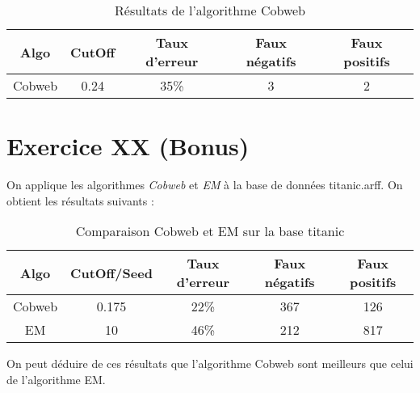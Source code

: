 \documentclass[a4paper, 11pt]{report}
\begin{document}
        \begin{table}[h!]
        \centering
        \begin{tabular}{| c | c | c | c | c |}
        \hline
         Algo & CutOff & Taux d'erreur & Faux négatifs & Faux positifs  \\
         \hline
         Cobweb & 0.24 & 35\% & 3 & 2 \\
         \hline
         
         
        \end{tabular}
        \caption{Résultats de l'algorithme Cobweb}
        \label{tab:exo18}
        \end{table}
        
        \section{Exercice XX (Bonus)}
        On applique les algorithmes \emph{Cobweb} et \emph{EM} à la base de données titanic.arff. On obtient les résultats suivants :
        \begin{table}[h!]
        \centering
        \begin{tabular}{| c | c | c | c | c |}
        \hline
         Algo & CutOff/Seed & Taux d'erreur & Faux négatifs & Faux positifs  \\
         \hline
         Cobweb & 0.175 & 22\% & 367 & 126 \\
         \hline
         EM & 10 & 46\% & 212 & 817 \\
         \hline
         
        \end{tabular}
        \caption{Comparaison Cobweb et EM sur la base titanic}
        \label{tab:exo20}
        \end{table}
        
        On peut déduire de ces résultats que l'algorithme Cobweb sont meilleurs que celui de l'algorithme EM.
        
\end{document}
